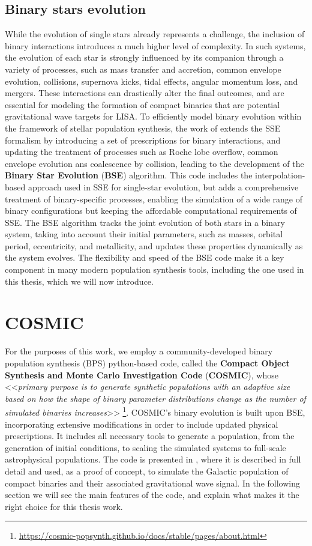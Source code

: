 \subsection{Binary stars evolution}
While the evolution of single stars already represents a challenge, the inclusion of binary interactions introduces a much higher level of complexity.
In such systems, the evolution of each star is strongly influenced by its companion through a variety of processes, such as mass transfer and accretion, common envelope evolution, collisions, supernova kicks, tidal effects, angular momentum loss, and mergers.
These interactions can drastically alter the final outcomes, and are essential for modeling the formation of compact binaries that are potential gravitational wave targets for LISA.
To efficiently model binary evolution within the framework of stellar population synthesis, the work of \cite{BSE} extends the SSE formalism by introducing a set of prescriptions for binary interactions, and updating the treatment of processes such as Roche lobe overflow, common envelope evolution ans coalescence by collision, leading to the development of the \textbf{Binary Star Evolution} (\textbf{BSE}) algorithm.
This code includes the interpolation-based approach used in SSE for single-star evolution, but adds a comprehensive treatment of binary-specific processes, enabling the simulation of a wide range of binary configurations but keeping the affordable computational requirements of SSE.
The BSE algorithm tracks the joint evolution of both stars in a binary system, taking into account their initial parameters, such as masses, orbital period, eccentricity, and metallicity, and updates these properties dynamically as the system evolves.
The flexibility and speed of the BSE code make it a key component in many modern population synthesis tools, including the one used in this thesis, which we will now introduce.

\section{COSMIC}
For the purposes of this work, we employ a community-developed binary population synthesis (BPS) python-based code, called the \textbf{Compact Object Synthesis and Monte Carlo Investigation Code} (\textbf{COSMIC}), whose <<\textit{primary purpose is to generate synthetic populations with an adaptive size based on how the shape of binary parameter distributions change as the number of simulated binaries increases}>>
\footnote{\url{https://cosmic-popsynth.github.io/docs/stable/pages/about.html}}. 
COSMIC's binary evolution is built upon BSE, incorporating extensive modifications in order to include updated physical prescriptions.
It  includes all necessary tools to generate a population, from the generation of initial conditions, to scaling the simulated systems to full-scale astrophysical populations.
The code is presented in \cite{Breivik}, where it is described in full detail and used, as a proof of concept, to simulate the Galactic population of compact binaries and their associated gravitational wave signal.
In the following section we will see the main features of the code, and explain what makes it the right choice for this thesis work.


